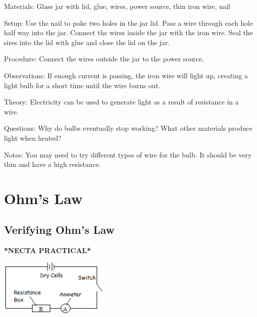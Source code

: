 \begin{multicols}{2}
\begin{description*}
\item[Materials:]{Glass jar with lid, glue, wires, power source, thin iron wire, nail}
\item[Setup:]{Use the nail to poke two holes in the jar lid. Pass a wire through each hole half way into the jar. Connect the wires inside the jar with the iron wire. Seal the sires into the lid with glue and close the lid on the jar.}
\item[Procedure:]{Connect the wires outside the jar to the power source.}
\item[Observations:]{If enough current is passing, the iron wire will light up, creating a light bulb for a short time until the wire burns out.}
\item[Theory:]{Electricity can be used to generate light as a result of resistance in a wire.}
\item[Questions:]{Why do bulbs eventually stop working? What other materials produce light when heated?}
\item[Notes:]{You may need to try different types of wire for the bulb. It should be very thin and have a high resistance.}
\end{description*}


\section*{Ohm's Law} 


\subsection{Verifying Ohm's Law} 
\textbf{*NECTA PRACTICAL*}

\begin{center}
\includegraphics[width=0.4\textwidth]{./img/ohms-law.png}
\end{center}


\end{multicols}
